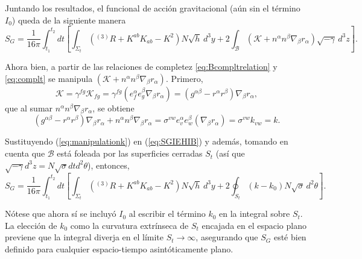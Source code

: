 Juntando los resultados, el funcional de acci\'{o}n gravitacional (a\'{u}n sin el t\'{e}rmino $I_{0}$) queda de la siguiente manera
%
\begin{equation}
\label{eq:SGIEHIB}
S_{G} = \frac{1}{16 \pi} \int^{t_{2}}_{t_{1}} dt \left[ \int_{\Sigma_{t}} (^{(3)}R + K^{ab} K_{ab} - K^{2}) N \sqrt{h} \, d^{3} y + 2 \int_{\mathcal{B}} (\mathcal{K} + n^{\alpha} n^{\beta} \nabla_{\beta} r_{\alpha}) \sqrt{-\gamma} \, d^{3} z\right].
\end{equation}

Ahora bien, a partir de las relaciones de completez \eqref{eq:Bcompltrelation} y \eqref{eq:complt} se manipula $(\mathcal{K} + n^{\alpha} n^{\beta} \nabla_{\beta} r_{\alpha})$. Primero,
%
\begin{equation}
\mathcal{K} = \gamma^{fg} \mathcal{K}_{fg} = \gamma^{fg} (e^{\alpha}_{f} e^{\beta}_{g} \nabla_{\beta} r_{\alpha}) = (g^{\alpha \beta} - r^{\alpha} r^{\beta}) \nabla_{\beta} r_{\alpha},
\end{equation}
%
que al sumar $n^{\alpha} n^{\beta} \nabla_{\beta} r_{\alpha}$, se obtiene
%
\begin{equation}
\label{eq:manipulationk}
(g^{\alpha \beta} - r^{\alpha} r^{\beta}) \nabla_{\beta} r_{\alpha} + n^{\alpha} n^{\beta} \nabla_{\beta} r_{\alpha} = \sigma^{vw} e^{\alpha}_{v} e^{\beta}_{w} (\nabla_{\beta} r_{\alpha}) = \sigma^{vw} k_{vw} = k.
\end{equation}

Sustituyendo (\ref{eq:manipulationk}) en (\ref{eq:SGIEHIB}) y adem\'{a}s, tomando en cuenta que $\mathcal{B}$ est\'{a} foleada por las superficies cerradas $S_{t}$ (as\'{i} que $\sqrt{-\gamma} d^{3} z = N \sqrt{\sigma} dt d^{2} \theta$), entonces,
%
\begin{equation}
\label{eq:LagSg}
S_{G} = \frac{1}{16 \pi} \int^{t_{2}}_{t_{1}} dt \left[ \int_{\Sigma_{t}} (^{(3)}R + K^{ab} K_{ab} - K^{2}) N \sqrt{h} \, d^{3} y + 2 \oint_{S_{t}} (k - k_{0}) N \sqrt{\sigma} \, d^{2} \theta \right].
\end{equation}

N\'{o}tese que ahora s\'{i} se incluy\'{o} $I_{0}$ al escribir el t\'{e}rmino $k_{0}$ en la integral sobre $S_{t}$. La elecci\'{o}n de $k_{0}$ como la curvatura extr\'{i}nseca de $S_{t}$ encajada en el espacio plano previene que la integral diverja en el l\'{i}mite $S_{t} \rightarrow \infty$, asegurando que $S_{G}$ est\'{e} bien definido para cualquier espacio-tiempo asint\'{o}ticamente plano.
